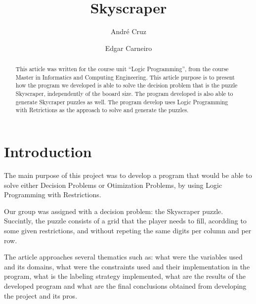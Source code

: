 \documentclass{llncs}
\begin{document}
\title{Skyscraper}
%
%
\author{André Cruz \and Edgar Carneiro}
%
%
%

\maketitle              %

\begin{abstract}
This article was written for the course unit ``Logic Programming'', from the course Master in Informatics and Computing Engineering.
This article purpose is to present how the program we developed is able to solve the decision problem that is the puzzle Skyscraper, independently of the booard size.
The program developed is also able to generate Skycraper puzzles as well. The program develop uses Logic Programming with Retrictions as the approach to solve and generate the puzzles.
\end{abstract}
%
\section{Introduction}
%
The main purpose of this project was to develop a program that would be able to solve either Decision Problems or Otimization Problems, by using Logic Programming with Restrictions.

Our group was assigned with a decision problem: the Skyscraper puzzle. Succintly, the puzzle consists of a grid that the player needs to fill, acordding to some given restrictions, and without repeting the same digits per column and per row.

The article approaches several thematics such as: what were the variables used and its domains, what were the constraints used and their implementation in the program, what is the labeling strategy implemented, what are the results of the developed program and what are the final conclusions obtained from developing the project and its pros.
\end{document}
